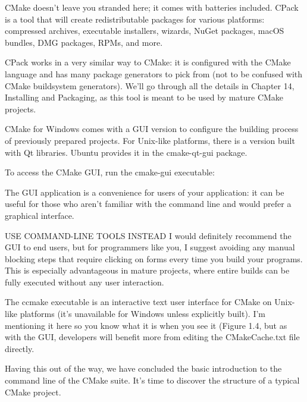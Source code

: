 CMake doesn’t leave you stranded here; it comes with batteries included. CPack is a tool that will create redistributable packages for various platforms: compressed archives, executable installers, wizards, NuGet packages, macOS bundles, DMG packages, RPMs, and more.

CPack works in a very similar way to CMake: it is configured with the CMake language and has many package generators to pick from (not to be confused with CMake buildsystem generators).
We’ll go through all the details in Chapter 14, Installing and Packaging, as this tool is meant to be used by mature CMake projects.


CMake for Windows comes with a GUI version to configure the building process of previously prepared projects. For Unix-like platforms, there is a version built with Qt libraries. Ubuntu provides it in the cmake-qt-gui package.

To access the CMake GUI, run the cmake-gui executable:


The GUI application is a convenience for users of your application: it can be useful for those who aren’t familiar with the command line and would prefer a graphical interface.

\begin{myNotic}{USE COMMAND-LINE TOOLS INSTEAD}
I would definitely recommend the GUI to end users, but for programmers like you, I suggest avoiding any manual blocking steps that require clicking on forms every time you build your programs. This is especially advantageous in mature projects, where entire builds can be fully executed without any user interaction.
\end{myNotic}


The ccmake executable is an interactive text user interface for CMake on Unix-like platforms (it’s unavailable for Windows unless explicitly built). I’m mentioning it here so you know what it is when you see it (Figure 1.4, but as with the GUI, developers will benefit more from editing the CMakeCache.txt file directly.


Having this out of the way, we have concluded the basic introduction to the command line of the CMake suite. It’s time to discover the structure of a typical CMake project.

















